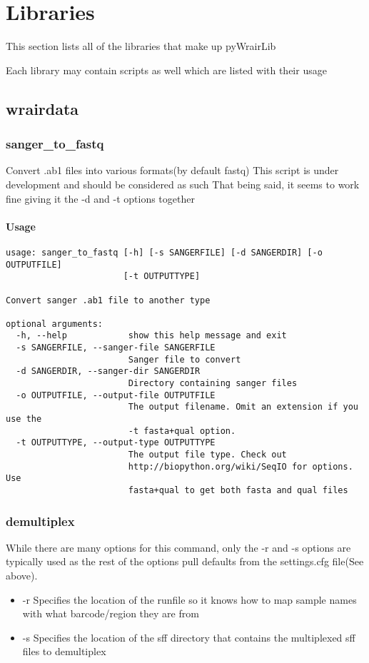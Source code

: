 \documentclass{article}
\begin{document}
\section{Libraries}
This section lists all of the libraries that make up pyWrairLib

Each library may contain scripts as well which are listed with their usage

\subsection{wrairdata}

\subsubsection{sanger\_to\_fastq}
Convert .ab1 files into various formats(by default fastq)
This script is under development and should be considered as such
That being said, it seems to work fine giving it the -d and -t options together

\paragraph{Usage}

\begin{lstlisting}
usage: sanger_to_fastq [-h] [-s SANGERFILE] [-d SANGERDIR] [-o OUTPUTFILE]
                       [-t OUTPUTTYPE]

Convert sanger .ab1 file to another type

optional arguments:
  -h, --help            show this help message and exit
  -s SANGERFILE, --sanger-file SANGERFILE
                        Sanger file to convert
  -d SANGERDIR, --sanger-dir SANGERDIR
                        Directory containing sanger files
  -o OUTPUTFILE, --output-file OUTPUTFILE
                        The output filename. Omit an extension if you use the
                        -t fasta+qual option.
  -t OUTPUTTYPE, --output-type OUTPUTTYPE
                        The output file type. Check out
                        http://biopython.org/wiki/SeqIO for options. Use
                        fasta+qual to get both fasta and qual files
\end{lstlisting}

\subsubsection{demultiplex}
While there are many options for this command, only the -r and -s options are typically used as the rest of the options pull defaults from the settings.cfg file(See above).
\begin{itemize}
 \item -r Specifies the location of the runfile so it knows how to map sample names with what barcode/region they are from
 \item -s Specifies the location of the sff directory that contains the multiplexed sff files to demultiplex
\end{itemize}
\end{document}
